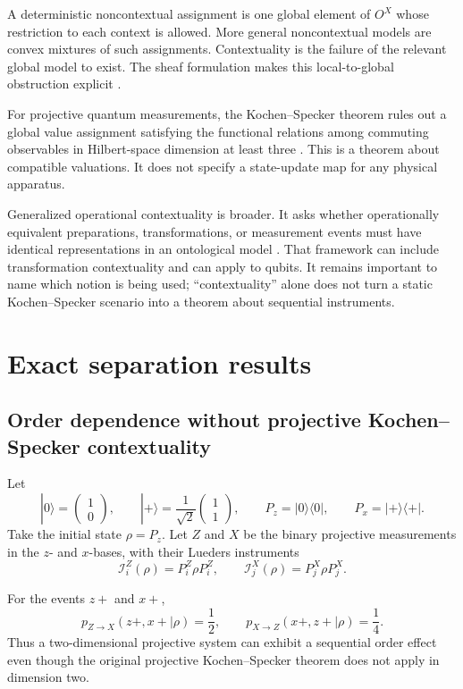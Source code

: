\documentclass[11pt]{article}
\newcommand{\cI}{\mathcal{I}}
\begin{document}
A deterministic noncontextual assignment is one global element of \(O^X\)
whose restriction to each context is allowed. More general noncontextual
models are convex mixtures of such assignments. Contextuality is the failure
of the relevant global model to exist. The sheaf formulation makes this
local-to-global obstruction explicit \cite{AbramskyBrandenburger2011}.

For projective quantum measurements, the Kochen--Specker theorem rules out a
global value assignment satisfying the functional relations among commuting
observables in Hilbert-space dimension at least three
\cite{KochenSpecker1967}. This is a theorem about compatible valuations. It
does not specify a state-update map for any physical apparatus.

Generalized operational contextuality is broader. It asks whether
operationally equivalent preparations, transformations, or measurement events
must have identical representations in an ontological model
\cite{Spekkens2005}. That framework can include transformation
contextuality and can apply to qubits. It remains important to name which
notion is being used; ``contextuality'' alone does not turn a static
Kochen--Specker scenario into a theorem about sequential instruments.

\section{Exact separation results}

\subsection{Order dependence without projective Kochen--Specker contextuality}

Let
\[
|0\rangle=
\begin{pmatrix}1\\0\end{pmatrix},
\qquad
|+\rangle=\frac{1}{\sqrt2}
\begin{pmatrix}1\\1\end{pmatrix},
\qquad
P_z=|0\rangle\langle0|,
\qquad
P_x=|+\rangle\langle+|.
\]
Take the initial state \(\rho=P_z\). Let \(Z\) and \(X\) be the binary
projective measurements in the \(z\)- and \(x\)-bases, with their Lueders
instruments
\[
\cI_i^Z(\rho)=P_i^Z\rho P_i^Z,
\qquad
\cI_j^X(\rho)=P_j^X\rho P_j^X .
\]

\begin{proposition}
\label{prop:qubit-order}
For the events \(z+\) and \(x+\),
\[
p_{Z\rightarrow X}(z+,x+|\rho)=\frac12,
\qquad
p_{X\rightarrow Z}(x+,z+|\rho)=\frac14.
\]
Thus a two-dimensional projective system can exhibit a sequential order
effect even though the original projective Kochen--Specker theorem does not
apply in dimension two.
\end{proposition}
\end{document}
